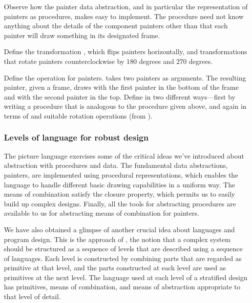 Observe how the painter data abstraction, and in particular the representation of painters as procedures, makes  easy to implement.
The  procedure need not know anything about the details of the component painters other than that each painter will draw something in its designated frame.

\begin{exercise}
	\label{Exercise 2.50}
	Define the transformation , which flips painters horizontally, and transformations that rotate painters counterclockwise by \( 180 \) degrees and \( 270 \) degrees.
\end{exercise}



\begin{exercise}
	\label{Exercise 2.51}
	Define the  operation for painters.
	 takes two painters as arguments.
	The resulting painter, given a frame, draws with the first painter in the bottom of the frame and with the second painter in the top.
	Define  in two different ways---first by writing a procedure that is analogous to the  procedure given above, and again in terms of  and suitable rotation operations (from ).
\end{exercise}



\subsubsection*{Levels of language for robust design}

The picture language exercises some of the critical ideas we’ve introduced about abstraction with procedures and data.
The fundamental data abstractions, painters, are implemented using procedural representations, which enables the language to handle different basic drawing capabilities in a uniform way.
The means of combination satisfy the closure property, which permits us to easily build up complex designs.
Finally, all the tools for abstracting procedures are available to us for abstracting means of combination for painters.

We have also obtained a glimpse of another crucial idea about languages and program design.
This is the approach of , the notion that a complex system should be structured as a sequence of levels that are described using a sequence of languages.
Each level is constructed by combining parts that are regarded as primitive at that level, and the parts constructed at each level are used as primitives at the next level.
The language used at each level of a stratified design has primitives, means of combination, and means of abstraction appropriate to that level of detail.

